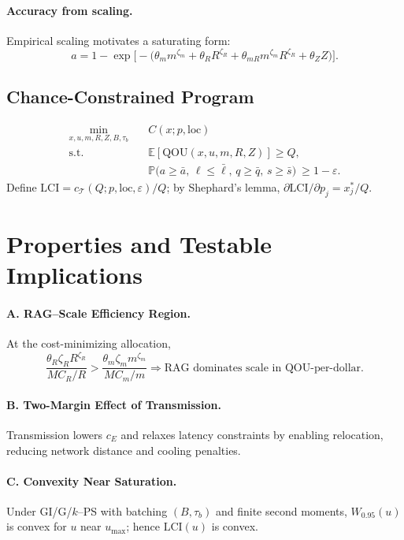 \documentclass[12pt]{article}
\numberwithin{equation}{section}
\newcommand{\QOU}{\mathrm{QOU}}
\newcommand{\LCI}{\mathrm{LCI}}
\newcommand{\E}{\mathbb{E}}
\newcommand{\Prb}{\mathbb{P}}
\newcommand{\elloc}{\mathrm{loc}}
\begin{document}
\paragraph{Accuracy from scaling.}
Empirical scaling motivates a saturating form:
\begin{equation}
a = 1 - \exp\!\Big[-\big(\theta_m m^{\zeta_m} + \theta_R R^{\zeta_R} + \theta_{mR} m^{\zeta_m}R^{\zeta_R} + \theta_Z Z\big)\Big].
\end{equation}

\subsection{Chance-Constrained Program}
\begin{equation}
\label{eq:program}
\begin{aligned}
\min_{x,u,m,R,Z,B,\tau_b} \quad & C(x;p,\elloc) \\
\text{s.t.} \quad
& \E[\QOU(x,u,m,R,Z)] \ge Q,\\
& \Prb\!\big(a\!\ge\!\bar a,\, \ell\!\le\!\bar\ell,\, q\!\ge\!\bar q,\, s\!\ge\!\bar s\big)\ \ge 1-\varepsilon.
\end{aligned}
\end{equation}
Define $\LCI=c_{\mathcal{T}}(Q;p,\elloc,\varepsilon)/Q$; by Shephard’s lemma, $\partial \LCI/\partial p_j=x_j^*/Q$.

\section{Properties and Testable Implications}

\paragraph{A. RAG–Scale Efficiency Region.}
At the cost-minimizing allocation,
\[
\frac{\theta_R \zeta_R R^{\zeta_R}}{MC_R/R} >
\frac{\theta_m \zeta_m m^{\zeta_m}}{MC_m/m}
\Rightarrow \text{RAG dominates scale in QOU-per-dollar.}
\]

\paragraph{B. Two-Margin Effect of Transmission.}
Transmission lowers $c_E$ and relaxes latency constraints by enabling relocation, reducing network distance and cooling penalties.

\paragraph{C. Convexity Near Saturation.}
Under GI/G/$k$–PS with batching $(B,\tau_b)$ and finite second moments, $W_{0.95}(u)$ is convex for $u$ near $u_{\max}$; hence $\LCI(u)$ is convex.
\end{document}
